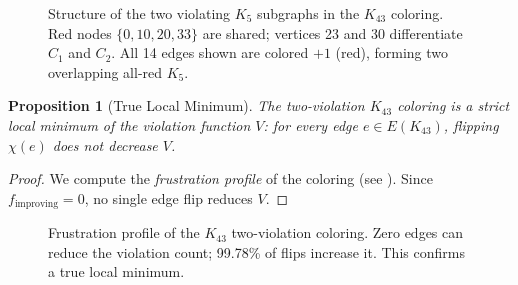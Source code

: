 \documentclass[11pt,a4paper]{article}
\theoremstyle{plain}
\newtheorem{proposition}[theorem]{Proposition}
\theoremstyle{remark}
\begin{document}
\begin{figure}[H]
\caption{Structure of the two violating $K_5$ subgraphs in the
  $K_{43}$ coloring. Red nodes $\{0, 10, 20, 33\}$ are shared;
  vertices 23 and 30 differentiate $C_1$ and $C_2$.
  All 14 edges shown are colored $+1$ (red), forming two
  overlapping all-red $K_5$.}
\label{fig:violating-cliques}
\end{figure}

\begin{proposition}[True Local Minimum]\label{prop:local-min}
The two-violation $K_{43}$ coloring is a strict local minimum of
the violation function $V$: for every edge $e \in E(K_{43})$,
flipping $\chi(e)$ does not decrease $V$.
\end{proposition}

\begin{proof}
We compute the \emph{frustration profile} of the coloring
(see ).
Since $f_{\text{improving}} = 0$, no single edge flip reduces $V$.
\end{proof}

\begin{figure}[H]
\centering
{}
\caption{Frustration profile of the $K_{43}$ two-violation coloring.
  Zero edges can reduce the violation count; 99.78\% of flips
  increase it. This confirms a true local minimum.}
\label{fig:frustration-pie}
\end{figure}
\end{document}

